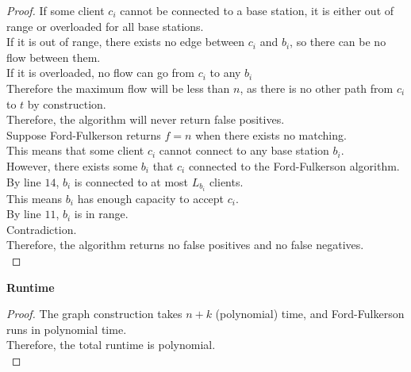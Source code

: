 \begin{problem}
\begin{proof}
      If some client $c_i$ cannot be connected to a base station, it is either out of range or overloaded for all base stations. \\
      If it is out of range, there exists no edge between $c_i$ and $b_i$, so there can be no flow between them. \\
      If it is overloaded, no flow can go from $c_i$ to any $b_i$ \\
      Therefore the maximum flow will be less than $n$, as there is no other path from $c_i$ to $t$ by construction. \\
      Therefore, the algorithm will never return false positives. \\
      Suppose Ford-Fulkerson returns $f = n$ when there exists no matching. \\
      This means that some client $c_i$ cannot connect to any base station $b_i$. \\
      However, there exists some $b_i$ that $c_i$ connected to the Ford-Fulkerson algorithm. \\
      By line $14$, $b_i$ is connected to at most $L_{b_i}$ clients. \\
      This means $b_i$ has enough capacity to accept $c_i$. \\
      By line $11$, $b_i$ is in range. \\
      Contradiction. \\
      Therefore, the algorithm returns no false positives and no false negatives. \\
  \end{proof}
  \noindent
  \textbf{Runtime}
  \begin{proof}
      The graph construction takes $n + k$ (polynomial) time, and Ford-Fulkerson runs in polynomial time. \\
      Therefore, the total runtime is polynomial. \\
  \end{proof}
\end{problem}
